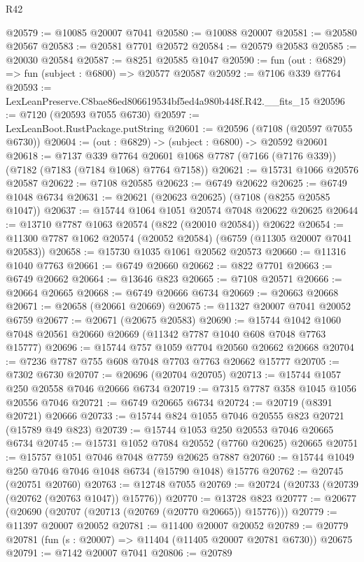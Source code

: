 \begin{lexlean}{R42}
\begin{coremodule}
{@20579 := @10085 @20007 @7041
@20580 := @10088 @20007
@20581 := @20580 @20567
@20583 := @20581 @7701 @20572
@20584 := @20579 @20583
@20585 := @20030 @20584
@20587 := @8251 @20585 @1047
@20590 := fun (out : @6829) => fun (subject : @6800) => @20577 @20587
@20592 := @7106 @339 @7764
@20593 := LexLeanPreserve.C8bae86ed806619534bf5ed4a980b448f.R42.__fits_15
@20596 := @7120 (@20593 @7055 @6730)
@20597 := LexLeanBoot.RustPackage.putString
@20601 := @20596 (@7108 (@20597 @7055 @6730))
@20604 := (out : @6829) -> (subject : @6800) -> @20592 @20601
@20618 := @7137
    @339
    @7764
    @20601
    @1068
    @7787
    (@7166 (@7176 @339))
    (@7182 (@7183 (@7184 @1068) @7764 @7158))
@20621 := @15731 @1066 @20576 @20587
@20622 := @7108 @20585
@20623 := @6749 @20622
@20625 := @6749 @1048 @6734
@20631 := @20621 (@20623 @20625) (@7108 (@8255 @20585 @1047))
@20637 := @15744 @1064 @1051 @20574 @7048 @20622 @20625
@20644 := @13710 @7787 @1063 @20574 (@822 (@20010 @20584)) @20622
@20654 := @11300 @7787 @1062 @20574 (@20052 @20584) (@6759 (@11305 @20007 @7041 @20583))
@20658 := @15730 @1035 @1061 @20562 @20573
@20660 := @11316 @1040 @7763
@20661 := @6749 @20660
@20662 := @822 @7701
@20663 := @6749 @20662
@20664 := @13646 @823
@20665 := @7108 @20571
@20666 := @20664 @20665
@20668 := @6749 @20666 @6734
@20669 := @20663 @20668
@20671 := @20658 (@20661 @20669)
@20675 := @11327 @20007 @7041 @20052 @6759
@20677 := @20671 (@20675 @20583)
@20690 := @15744 @1042 @1060 @7048 @20561 @20660 @20669 (@11342 @7787 @1040 @608 @7048 @7763 @15777)
@20696 := @15744 @757 @1059 @7704 @20560 @20662 @20668
@20704 := @7236 @7787 @755 @608 @7048 @7703 @7763 @20662 @15777
@20705 := @7302 @6730
@20707 := @20696 (@20704 @20705)
@20713 := @15744 @1057 @250 @20558 @7046 @20666 @6734
@20719 := @7315 @7787 @358 @1045 @1056 @20556 @7046
@20721 := @6749 @20665 @6734
@20724 := @20719 (@8391 @20721) @20666
@20733 := @15744 @824 @1055 @7046 @20555 @823 @20721 (@15789 @49 @823)
@20739 := @15744 @1053 @250 @20553 @7046 @20665 @6734
@20745 := @15731 @1052 @7084 @20552 (@7760 @20625) @20665
@20751 := @15757 @1051 @7046 @7048 @7759 @20625 @7887
@20760 := @15744 @1049 @250 @7046 @7046 @1048 @6734 (@15790 @1048) @15776
@20762 := @20745 (@20751 @20760)
@20763 := @12748 @7055
@20769 := @20724 (@20733 (@20739 (@20762 (@20763 @1047)) @15776))
@20770 := @13728 @823
@20777 := @20677 (@20690 (@20707 (@20713 (@20769 (@20770 @20665)) @15776)))
@20779 := @11397 @20007 @20052
@20781 := @11400 @20007 @20052
@20789 := @20779 @20781 (fun (s : @20007) => @11404 (@11405 @20007 @20781 @6730)) @20675
@20791 := @7142 @20007 @7041
@20806 := @20789
}
\end{coremodule}
\end{lexlean}
